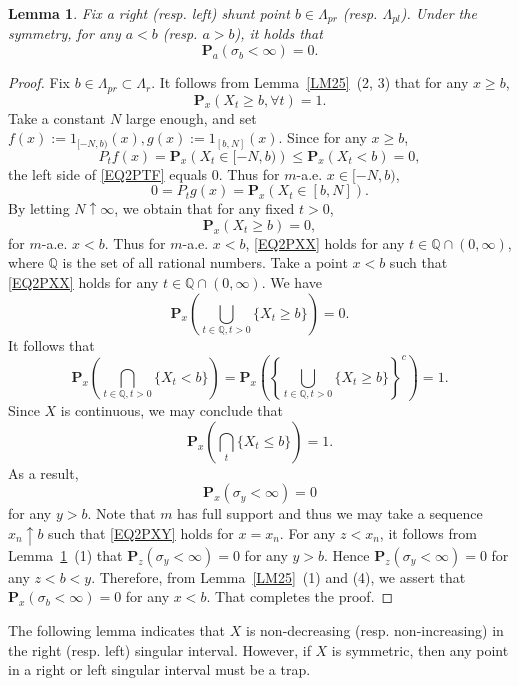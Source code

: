 \documentclass[a4paper]{amsart}
\newtheorem{lemma}[theorem]{Lemma}
\theoremstyle{definition}
\theoremstyle{remark}
\numberwithin{equation}{section}
\begin{document}
\begin{lemma}\label{LM26}
Fix a right (resp. left) shunt point $b\in \Lambda_{pr}$ (resp. $\Lambda_{pl}$). Under the symmetry, for any $a<b$ (resp. $a>b$), it holds that
\[
	\mathbf{P}_a(\sigma_b<\infty)=0.
\]
\end{lemma}
\begin{proof}
Fix $b\in \Lambda_{pr}\subset \Lambda_r$. It follows from Lemma~\ref{LM25}~(2, 3) that for any $x\geq b$,
\[
\mathbf{P}_x(X_t\geq b, \forall t)=1.
\]
Take a constant $N$ large enough, and set $f(x):=1_{[-N,b)}(x), g(x):=1_{[b,N]}(x)$. Since for any $x\geq b$,
\[
P_tf(x)=\mathbf{P}_x\left(X_t\in [-N,b)\right)\leq \mathbf{P}_x(X_t<b)=0,
\]
the left side of \eqref{EQ2PTF} equals $0$. Thus for $m$-a.e. $x\in [-N, b)$,
\[
	0=P_tg(x)=\mathbf{P}_x(X_t\in [b, N]).
\]
By letting $N\uparrow \infty$, we obtain that for any fixed $t>0$,
\begin{equation}\label{EQ2PXX}
	\mathbf{P}_x(X_t\geq b)=0,
	\end{equation}
 for $m$-a.e. $x<b$. Thus for $m$-a.e. $x<b$, \eqref{EQ2PXX} holds for  any $t\in \mathbb{Q}\cap (0,\infty)$, where $\mathbb{Q}$ is the set of all rational numbers. Take a point $x<b$ such that \eqref{EQ2PXX} holds for any $t\in \mathbb{Q}\cap (0,\infty)$. We have
 \[
 	\mathbf{P}_x\left(\bigcup_{t\in \mathbb{Q}, t>0} \{X_t\geq b\}\right)=0.
 \]
It follows that
\[
\mathbf{P}_x\left(\bigcap_{t\in \mathbb{Q}, t>0}\{X_t<b\}\right)=\mathbf{P}_x\left(\left\{\bigcup_{t\in \mathbb{Q}, t>0}\{X_t\geq b\}\right\}^c  \right)=1.
\]
Since $X$ is continuous, we may conclude that
\begin{equation}\label{EQ2PXT}
\mathbf{P}_x\left(\bigcap_{t}\{X_t\leq b\}\right)=1.
\end{equation}
As a result,
\begin{equation}\label{EQ2PXY}
	\mathbf{P}_x(\sigma_y<\infty)=0
\end{equation}
 for any $y>b$. Note that $m$ has full support and thus we may take a sequence $x_n \uparrow b$ such that \eqref{EQ2PXY} holds for $x=x_n$. For any $z<x_n$, it follows from Lemma~\ref{LM26}~(1) that $\mathbf{P}_z(\sigma_y<\infty)=0$ for any $y>b$. Hence $\mathbf{P}_z(\sigma_y<\infty)=0$ for any $z<b<y$.
 Therefore, from Lemma~\ref{LM25}~(1) and (4), we assert that $\mathbf{P}_x(\sigma_b<\infty)=0$ for any $x<b$. That completes the proof.
\end{proof}

The following lemma indicates that $X$ is non-decreasing (resp. non-increasing) in the right (resp. left) singular interval. However, if $X$ is symmetric, then any point in a right or left singular interval must be a trap.
\end{document}
